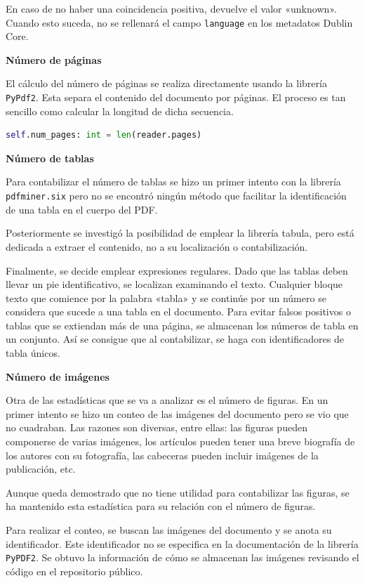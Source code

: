 \documentclass[../main.tex]{subfiles}
\begin{document}
En caso de no haber una coincidencia positiva, devuelve el valor «unknown». Cuando esto suceda, no se rellenará el campo \texttt{language} en los metadatos Dublin Core.

\textbf{Número de páginas}

El cálculo del número de páginas se realiza directamente usando la librería \texttt{PyPdf2}. Esta separa el contenido del documento por páginas. El proceso es tan sencillo como calcular la longitud de dicha secuencia.

\begin{lstlisting}[language=Python]
    self.num_pages: int = len(reader.pages)
\end{lstlisting}

\textbf{Número de tablas}

Para contabilizar el número de tablas se hizo un primer intento con la librería \texttt{pdfminer.six} pero no se encontró ningún método que facilitar la identificación de una tabla en el cuerpo del PDF.

Posteriormente se investigó la posibilidad de emplear la librería tabula, pero está dedicada a extraer el contenido, no a su localización o contabilización.

Finalmente, se decide emplear expresiones regulares. Dado que las tablas deben llevar un pie identificativo, se localizan examinando el texto. Cualquier bloque texto que comience por la palabra «tabla» y se continúe por un número se considera que sucede a una tabla en el documento. Para evitar falsos positivos o tablas que se extiendan más de una página, se almacenan los números de tabla en un conjunto. Así se consigue que al contabilizar, se haga con identificadores de tabla únicos.

\textbf{Número de imágenes}

Otra de las estadísticas que se va a analizar es el número de figuras. En un primer intento se hizo un conteo de las imágenes del documento pero se vio que no cuadraban. Las razones son diversas, entre ellas: las figuras pueden componerse de varias imágenes, los artículos pueden tener una breve biografía de los autores con su fotografía, las cabeceras pueden incluir imágenes de la publicación, etc.

Aunque queda demostrado que no tiene utilidad para contabilizar las figuras, se ha mantenido esta estadística para su relación con el número de figuras.

Para realizar el conteo, se buscan las imágenes del documento y se anota su identificador. Este identificador no se especifica en la documentación de la librería \texttt{PyPDF2}. Se obtuvo la información de cómo se almacenan las imágenes revisando el código en el repositorio público.
\end{document}
